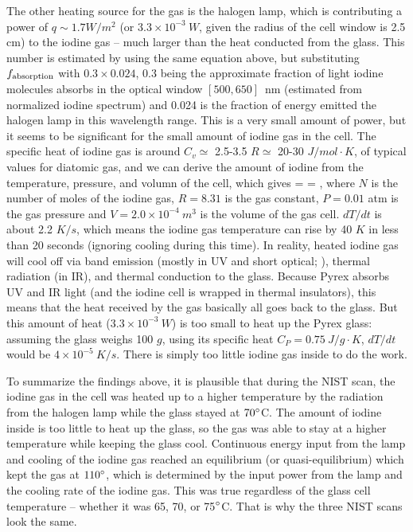 The other heating source for the gas is the halogen lamp, which is
contributing a power of $q \sim 1.7 W/m^2$ (or $3.3 \times 10^{-3}\
W$, given the radius of the cell window is 2.5 cm) to the iodine gas
-- much larger than the heat conducted from the glass. This number is
estimated by using the same equation above, but substituting $f_{\rm
absorption}$ with $0.3 \times 0.024$, 0.3 being the approximate
fraction of light iodine molecules absorbs in the optical window
$[500,650]$~nm (estimated from normalized iodine spectrum) and 0.024
is the fraction of energy emitted the halogen lamp in this wavelength
range. This is a very small amount of power, but it seems to be
significant for the small amount of iodine gas in the cell. The
specific heat of iodine gas is around $C_v \simeq$ 2.5-3.5 $R \simeq$
20-30 $J/mol\cdot K$, of typical values for diatomic gas, and we can
derive the amount of iodine from the temperature, pressure, and volumn
of the cell, which gives
\beq
{} =  = ,
\eeq
where $N$ is the number of moles of the iodine gas, $R=8.31$ is the
gas constant, $P=0.01$ atm is the gas pressure and $V = 2.0 \times
10^{-4}\ m^3$ is the volume of the gas cell. $dT/dt$ is about 2.2
$K/s$, which means the iodine gas temperature can rise by 40 $K$ in
less than 20 seconds (ignoring cooling during this time). In reality,
heated iodine gas will cool off via band emission (mostly in UV and
short optical; \citealt{waser1947emission}), thermal radiation (in
IR), and thermal conduction to the glass. Because Pyrex absorbs UV and
IR light (and the iodine cell is wrapped in thermal insulators), this
means that the heat received by the gas basically all goes back to the
glass. But this amount of heat ($3.3 \times 10^{-3}\ W$) is too small
to heat up the Pyrex glass: assuming the glass weighs 100 $g$, using
its specific heat $C_P = 0.75\ J/g\cdot K$, $dT/dt$ would be $4 \times
10^{-5}\ K/s$. There is simply too little iodine gas inside to do the work.

To summarize the findings above, it is plausible that during the NIST
scan, the iodine gas in the cell was heated up to a higher temperature
by the radiation from the halogen lamp while the glass stayed at
$70^{\circ}$C. The amount of iodine inside is too little to heat up the
glass, so the gas was able to stay at a higher temperature while
keeping the glass cool. Continuous energy input from the lamp and
cooling of the iodine gas reached an equilibrium (or
quasi-equilibrium) which kept the gas at $110^{\circ}$, which is
determined by the input power from the lamp and the cooling rate of
the iodine gas. This was true regardless of the glass cell temperature
-- whether it was 65, 70, or 75$^{\circ}$C. That is why the three NIST
scans look the same.

